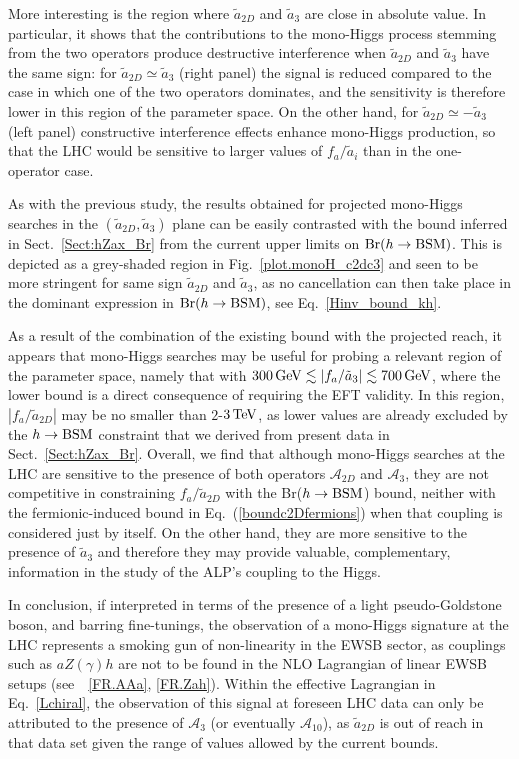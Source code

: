 \documentclass[11pt]{article}
\newcommand{\g}{\gamma}
\newcommand{\A}{\mathcal{A}}
\newcommand{\at}{\tilde{a}}
\DeclareMathOperator{\Br}{Br}
\renewcommand{\to}{\rightarrow}
\renewcommand{\[}{\begin{equation}}
\renewcommand{\]}{\end{equation}}
\begin{document}
More interesting is the region where $\at_{2D}$ and $\at_3$ are close in absolute value. In particular, it shows that the contributions to the 
mono-Higgs process stemming from the two operators produce destructive interference when $\at_{2D}$ and $\at_3$ have the same sign: for 
$\at_{2D}\simeq \at_3$ (right panel) the signal is reduced compared to the case in which one of the two operators dominates, and the sensitivity is 
therefore lower in this region of the parameter space. On the other hand, for $\at_{2D}\simeq - \at_3$ (left panel) constructive interference effects 
enhance mono-Higgs production, so that the LHC would be sensitive to larger values of $f_a/\at_i$ than in the one-operator case.
 
As with the previous study, the results obtained for projected mono-Higgs searches in the $(\at_{2D}, \at_3)$ plane can be easily contrasted with the 
bound inferred in Sect.~\ref{Sect:hZax_Br} from the current upper limits on $\Br(h\to {\rm BSM})$. This is depicted as a grey-shaded region 
in Fig.~\ref{plot.monoH_c2dc3} and seen to be more stringent for same sign $\at_{2D}$ and $\at_3$, as no cancellation can then take place   
 in the dominant expression in $\Br(h\to {\rm BSM})$, see Eq.~\eqref{Hinv_bound_kh}.
 
As a result of the combination of the existing bound with the projected reach, it appears that mono-Higgs searches may be useful for probing a relevant 
region of the parameter space, namely that with $\unit[300]{GeV}\lesssim |f_a/\at_3| \lesssim \unit[700]{GeV}$, 
where the lower bound is a direct consequence of requiring the EFT validity. In this region, $|f_a/\at_{2D}|$  may be no smaller than $2$-$\unit[3]{TeV}$, as 
lower values are already excluded by the $h\to {\rm BSM}$ constraint that we derived from present data in Sect.~\ref{Sect:hZax_Br}. 
Overall, we find that although mono-Higgs searches at the LHC are sensitive to the presence of both operators $\A_{2D}$ and $\A_3$, they are not competitive in constraining $f_a/\at_{2D}$ with 
the Br($h\to {\rm BSM}$) bound, neither with the fermionic-induced bound in Eq.~(\ref{boundc2Dfermions}) when that coupling is considered just by itself. On the other hand, they are more sensitive to the presence of $\at_3$ and therefore they may provide valuable, 
complementary, information in the study of the ALP's coupling to the Higgs. 

  
In conclusion, if interpreted in terms of the presence of a light pseudo-Goldstone boson, and barring fine-tunings, the observation of a mono-Higgs 
signature at the LHC represents a smoking gun of non-linearity in the EWSB sector, as couplings such as $aZ(\g)h$ are not to be found in the NLO Lagrangian 
of linear EWSB setups (see~~\ref{FR.AAa}, \ref{FR.Zah}). Within the  effective Lagrangian in Eq.~\eqref{Lchiral}, the observation of this signal at foreseen 
LHC data can only be attributed to the presence of $\A_3$ (or eventually $\A_{10}$), as  $\at_{2D}$ is out of reach in that data set given the range of values allowed 
by the current bounds.
\end{document}
